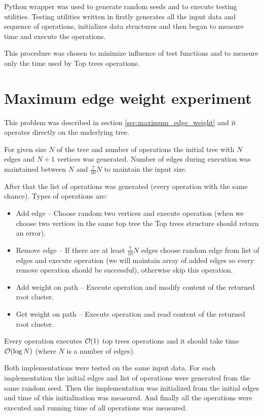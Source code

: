 Python wrapper was used to generate random seeds and to execute testing utilities.
Testing utilities written in \Cpp{} firstly generates all the input data and
sequence of operations, initializes data structures and then began to measure
time and execute the operations.

This procedure was chosen to minimize influence of test functions and to measure
only the time used by Top trees operations.

\vfill\eject %

\section{Maximum edge weight experiment}
\label{sec:experiment_maximum_edge_weight}

This problem was described in section \ref{sec:maximum_edge_weight} and it
operates directly on the underlying tree.

For given size $N$ of the tree and number of operations the initial tree with
$N$ edges and $N+1$ vertices was generated. Number of edges during execution was
maintained between $N$ and $\frac{7}{10}N$ to maintain the input size.

After that the list of operations was generated (every operation with the same
chance). Types of operations are:

\begin{itemize}
\item Add edge -- Choose random two vertices and execute \Link{} operation
(when we choose two vertices in the same top tree the Top trees structure should
return an error).
\item Remove edge -- If there are at least $\frac{7}{10}N$ edges choose random
edge from list of edges and execute \Cut{} operation (we will maintain array of
added edges so every remove operation should be successful), otherwise skip this
operation.
\item Add weight on path -- Execute \Expose{} operation and modify content of
the returned root cluster.
\item Get weight on path -- Execute \Expose{} operation and read content of the
returned root cluster.
\end{itemize}

Every operation executes ${\cal O}(1)$ top trees operations and it should take time
${\cal O}(\log N)$ (where $N$ is a number of edges).

Both implementations were tested on the same input data. For each implementation
the initial edges and list of operations were generated from the same random
seed. Then the implementation was initialized from the initial edges and time of
this initialization was measured. And finally all the operations were executed
and running time of all operations was measured.

